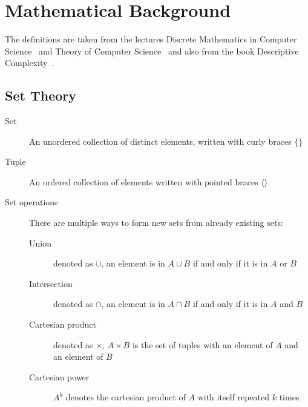 \chapter{Mathematical Background}\label{ch:mathematical-background}

The definitions are taken from the lectures Discrete Mathematics in Computer Science~\cite{discrete-maths} and Theory of Computer Science~\cite{theory-cs} and also from the book Descriptive Complexity~\cite{descriptive-complexity}.


\section{Set Theory}\label{sec:set-theory}
\begin{description}
    \item[Set] An unordered collection of distinct elements, written with curly braces $\{\}$
    \item[Tuple] An ordered collection of elements written with pointed braces $\langle  \rangle$
    \item[Set operations] There are multiple ways to form new sets from already existing sets:
    \begin{description}
        \item[Union] denoted as $\cup$, an element is in $A \cup B$ if and only if it is in $A$ or $B$
        \item[Intersection] denoted as $\cap$, an element is in $A \cap B$ if and only if it is in $A$ and $B$
        \item[Cartesian product] denoted as $\times$, $A \times B$ is the set of tuples with an element of $A$ and an element of $B$
        \item[Cartesian power] $A^k$ denotes the cartesian product of $A$ with itself repeated $k$ times
    \end{description}
\end{description}


